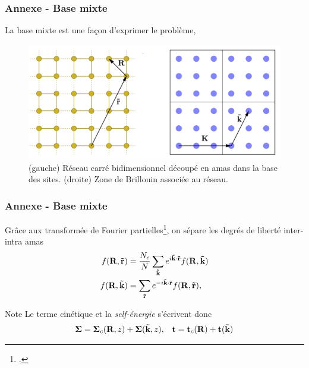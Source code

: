 \begin{frame}
    \frametitle{Annexe - Base mixte}
    La base mixte est une façon d'exprimer le problème,
    \begin{figure}
        \centering
        \includegraphics[scale=0.2]{./figures/theory/mixed_basis.png}
        \caption{(gauche) Réseau carré bidimensionnel découpé en amas dans la base des sites.
          (droite) Zone de Brillouin associée au réseau\footnotemark.}
        \label{fig: mixed_basis}
    \end{figure}
\end{frame}

\begin{frame}
    \frametitle{Annexe - Base mixte}
    Grâce aux transformée de Fourier partielles\footcite{MAIER}, on sépare
    les degrés de liberté inter-intra amas
    \begin{align}
      f(\vb{R}, \vb{\Tilde{r}}) &= \frac{N_c}{N}\sum_{\vb{\Tilde{k}}}e^{i\vb{\Tilde{k}}\cdot\vb{\Tilde{r}}}f(\vb{R}, \vb{\Tilde{k}})\\
      f(\vb{R}, \vb{\Tilde{k}}) &= \sum_{\vb{\Tilde{r}}}e^{-i\vb{\Tilde{k}}\cdot\vb{\Tilde{r}}}f(\vb{R}, \vb{\Tilde{r}}),
      \label{eq: partial_fourier}
    \end{align}
    \vfill
    \begin{noteblock}{Note}
      Le terme cinétique et la \textit{self-énergie} s'écrivent donc
      \begin{align*}
        \vb{\Sigma} = \vb{\Sigma}_c(\vb{R}, z) + \vb{\Sigma}(\vb{\tilde{k}}, z),
        &&\vb{t} = \vb{t}_c(\vb{R}) + \vb{t}(\vb{\tilde{k}})
      \end{align*}
    \end{noteblock}
\end{frame}

